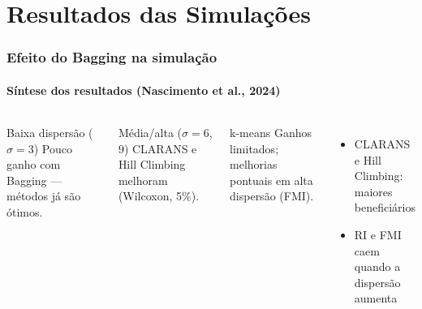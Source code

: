 \documentclass[brazilian,11pt]{beamer}
\begin{document}
\section[Resultados]{Resultados das Simulações}

\begin{frame}[shrink=8]
    \frametitle{Efeito do Bagging na simulação}
    \framesubtitle{Síntese dos resultados (Nascimento et al., 2024)}

    \begin{columns}[T]
        \begin{block}{Baixa dispersão ($\sigma = 3$)}
            \small Pouco ganho com Bagging --- métodos já são ótimos.
        \end{block}
        \begin{block}{Média/alta ($\sigma = 6$, $9$)}
            \small CLARANS e Hill Climbing melhoram (Wilcoxon, 5\%).
        \end{block}
        \begin{alertblock}{k-means}
            \small Ganhos limitados; melhorias pontuais em alta dispersão (FMI).
        \end{alertblock}
        \begin{itemize}
            \item \small CLARANS e Hill Climbing: maiores beneficiários
            \item \small RI e FMI caem quando a dispersão aumenta
        \end{itemize}
    \end{columns}
\end{frame}
\end{document}
